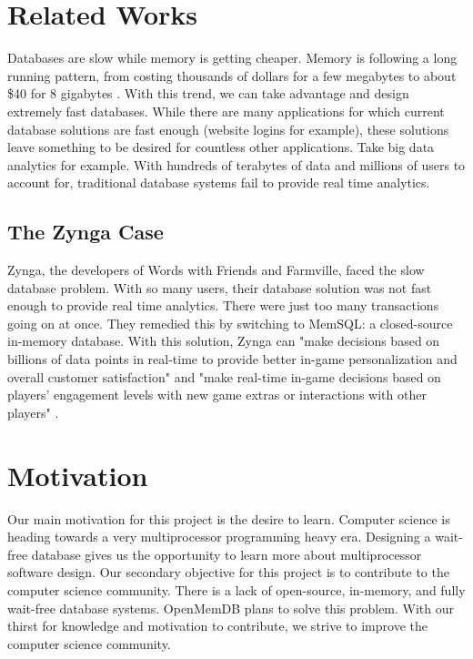 \documentclass[10pt]{article}
\begin{document}
	\section{Related Works}
	Databases are slow while memory is getting cheaper. Memory is following a long running pattern, from costing thousands of dollars for a few megabytes to about \$40 for 8 gigabytes \cite{jcmit}.
	With this trend, we can take advantage and design extremely fast databases.	While there are many applications for which	current database solutions are fast enough
	(website logins for example), these solutions leave something to be	desired	for countless other applications. Take big data analytics for example. With hundreds of terabytes of
	data and millions of users to	account for, traditional database	systems fail to provide real time analytics. 
	
	\subsection{The Zynga Case}Zynga, the developers of Words with Friends and Farmville, faced the slow database problem. With so many users, their database solution was not fast enough to provide real time analytics.
	There were just too many transactions going on at once. They remedied this by switching to MemSQL: a closed-source in-memory database. With this solution, Zynga can "make
	decisions based on billions of data points in real-time to provide better in-game personalization and overall customer satisfaction" \cite{MemSQL} and "make real-time
	in-game decisions based on players' engagement levels with new game extras or interactions with other players" \cite{MemSQL}.
	
	

	\section{Motivation}
	Our main motivation for this project is the desire to learn. Computer science is heading towards a very multiprocessor programming heavy era. Designing a wait-free database gives us the 		opportunity to learn more about multiprocessor software design. Our secondary objective for this project is to contribute to the computer science community. There is a lack of open-source, in-memory, and fully wait-free database systems. OpenMemDB plans to solve this problem. With our thirst for knowledge and motivation to contribute, we strive to improve the computer science community.

	\pagebreak

	
	
\end{document}
